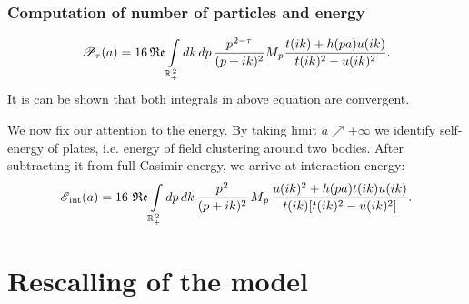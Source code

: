 \documentclass[10pt,t]{beamer}
\begin{document}
\begin{frame}
  \frametitle{Computation of number of particles and energy}

  \vspace{-1em}


  \begin{equation}
    \label{eq:Energia-i-liczba-czastek-dla-modelu-ETC-31}
    \mathcal{P}_{ \tau }( a ) =
    16 \operatorname{\mathfrak{Re}} \int\limits_{ \mathbb{R}_{ + }^{ \, 2 } } dk \, dp \,
    \frac{ p^{ \hspace{0.05em} 2 - \tau } }{ ( p + i k )^{ 2 } } M_{ \hspace{0.05em} p }
    \frac{ t( i k ) + h( p a ) u( i k ) }{ t( i k )^{ 2 } - u( i k )^{ 2 } }.
  \end{equation}
  It is can be shown that both integrals in above equation are convergent.

  We now fix our attention to the energy. By taking limit $a \nearrow +\infty$
  we identify self-energy of plates, i.e. energy of field clustering around
  two bodies. After subtracting it from full Casimir energy, we arrive
  at interaction energy:
  \begin{equation}
    \label{eq:Energia-i-liczba-czastek-dla-modelu-ETC-34}
    \mathcal{E}_{ \, \textrm{int}}( a ) =
    16 \, \operatorname{\mathfrak{Re}} \int\limits_{ \mathbb{R}_{ + }^{ \, 2 } } dp \, dk \,
    \frac{ p^{ \hspace{0.05em} 2 } }{ ( p + i k )^{ 2 } } \, M_{ \hspace{0.05em} p } \,
    \frac{ u( i k )^{ 2 } + h( p a ) t( i k ) u( i k ) }{
      t( i k ) [ t( i k )^{ 2 } - u( i k )^{ 2 } ] }.
  \end{equation}

\end{frame}










\section{Rescalling of the model}
\end{document}
